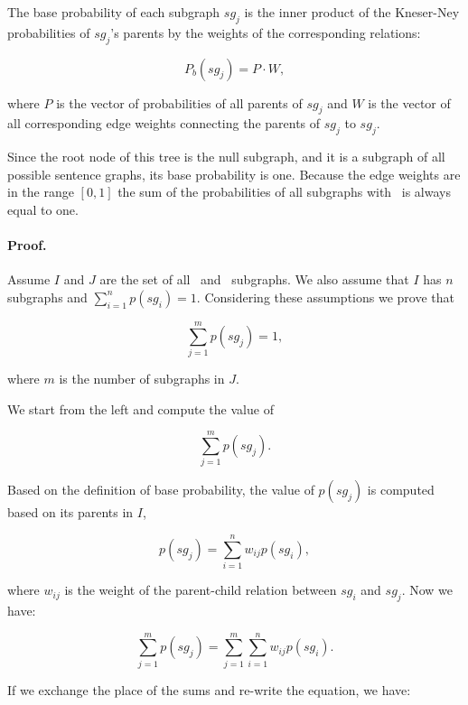 The base probability of each subgraph $sg_j$ is the inner product
of the Kneser-Ney probabilities of $sg_j$'s parents by the weights of
the corresponding relations:

\begin{equation}
P_b(sg_j)  = P \cdot W,
\end{equation}

\noindent
where $P$ is the vector of probabilities of all parents of 
$sg_j$ and $W$ is the vector of all corresponding edge weights
connecting the parents of $sg_j$ to $sg_j$.

Since the root node of this tree is the null subgraph, and it is a
subgraph of all possible sentence graphs, its base probability is
one. Because the edge weights are in the range $\left[0,1\right]$ the
sum of the probabilities of all subgraphs with \knode\ is always
equal to one.

\paragraph{Proof.} 
Assume $I$ and $J$ are the set of all \knode\ and \kplusnode\
subgraphs. We also assume that $I$ has $n$ subgraphs and $\sum_{i=1}^n
p(sg_i)=1$. Considering these assumptions we prove that

\begin{equation*}
\sum_{j=1}^m p(sg_j)=1,
\end{equation*}

\noindent
where $m$ is the number of subgraphs in $J$.

We start from the left and compute the value of 

\begin{equation*}
\sum_{j=1}^m p(sg_j).
\end{equation*}

\noindent
Based on the definition of base probability, the value of
$p(sg_j)$ is computed based on its parents in $I$,

\begin{equation*}
p(sg_j)=\sum_{i=1}^n w_{ij}p(sg_i),
\end{equation*}

\noindent
where $w_{ij}$ is the weight of the parent-child relation between
$sg_i$ and $sg_j$.  Now we have:

\begin{equation*}\sum_{j=1}^m p(sg_j) = \sum_{j=1}^m\sum_{i=1}^n w_{ij}p(sg_i).
\end{equation*}

\noindent
If we exchange the place of the sums and re-write the equation, we
have: 

